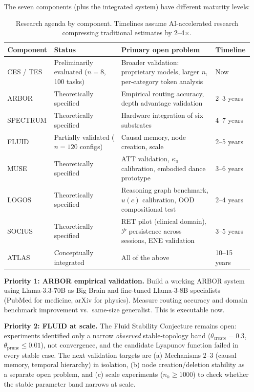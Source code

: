 \documentclass[12pt]{article}
\begin{document}
The seven components (plus the integrated system) have different maturity levels:

\begin{table}[H]
\centering\small
\begin{tabular}{lp{3cm}p{4cm}l}
\toprule
\textbf{Component} & \textbf{Status} & \textbf{Primary open problem} & \textbf{Timeline}\\
\midrule
CES / TES & Preliminarily evaluated ($n=8$, 100 tasks) & Broader validation: proprietary models, larger $n$, per-category token analysis & Now\\
ARBOR     & Theoretically specified & Empirical routing accuracy, depth advantage validation & 2--3 years\\
SPECTRUM  & Theoretically specified & Hardware integration of six substrates & 4--7 years\\
FLUID     & Partially validated ($n=120$ configs) & Causal memory, node creation, scale & 2--5 years\\
MUSE      & Theoretically specified & ATT validation, $\kappa_a$ calibration, embodied dance prototype & 3--6 years\\
LOGOS     & Theoretically specified & Reasoning graph benchmark, $u(c)$ calibration, OOD compositional test & 2--4 years\\
SOCIUS    & Theoretically specified & RET pilot (clinical domain), $\mathcal{P}$ persistence across sessions, ENE validation & 3--5 years\\
ATLAS     & Conceptually integrated & All of the above & 10--15 years\\
\bottomrule
\end{tabular}
\caption{Research agenda by component. Timelines assume AI-accelerated research compressing traditional estimates by 2--4$\times$.}
\end{table}

\textbf{Priority 1: ARBOR empirical validation.} Build a working ARBOR system using Llama-3.3-70B as Big Brain and fine-tuned Llama-3-8B specialists (PubMed for medicine, arXiv for physics). Measure routing accuracy and domain benchmark improvement vs.\ same-size generalist. This is executable now.

\textbf{Priority 2: FLUID at scale.} The Fluid Stability Conjecture remains open: experiments identified only a narrow \emph{observed} stable-topology band ($\theta_{\text{create}} = 0.3$, $\theta_{\text{prune}} \leq 0.01$), not convergence, and the candidate Lyapunov function failed in every stable case. The next validation targets are (a) Mechanisms 2--3 (causal memory, temporal hierarchy) in isolation, (b) node creation/deletion stability as a separate open problem, and (c) scale experiments ($n_h \geq 1000$) to check whether the stable parameter band narrows at scale.
\end{document}
